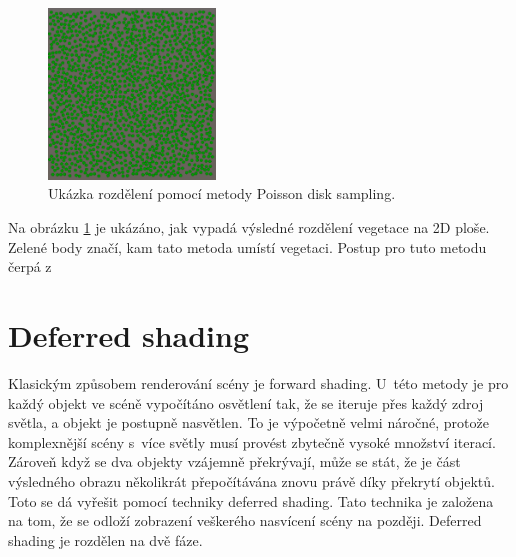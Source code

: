 \begin{figure}[H]
	\centering
	\includegraphics[width=12em]{images/generation/poisson.png}
	\caption[caption]{Ukázka rozdělení pomocí metody Poisson disk sampling.\footnotemark} 
	\label{poisson_vegetation}
\end{figure}
Na obrázku \ref{poisson_vegetation} je ukázáno, jak vypadá výsledné rozdělení vegetace na 2D ploše. Zelené body značí, kam tato metoda umístí vegetaci. Postup pro tuto metodu čerpá z~\cite{poisson-sampling}
\section{Deferred shading}
Klasickým způsobem renderování scény je forward shading. U~této metody je pro každý objekt ve scéně vypočítáno osvětlení tak, že se iteruje přes každý zdroj světla, a objekt je postupně nasvětlen. To je výpočetně velmi náročné, protože komplexnější scény s~více světly musí provést zbytečně vysoké množství iterací. Zároveň když se dva objekty vzájemně překrývají, může se stát, že je část výsledného obrazu několikrát přepočítávána znovu právě díky překrytí objektů. Toto se dá vyřešit pomocí techniky deferred shading. Tato technika je založena na tom, že se odloží zobrazení veškerého nasvícení scény na později. Deferred shading je rozdělen na dvě fáze.


